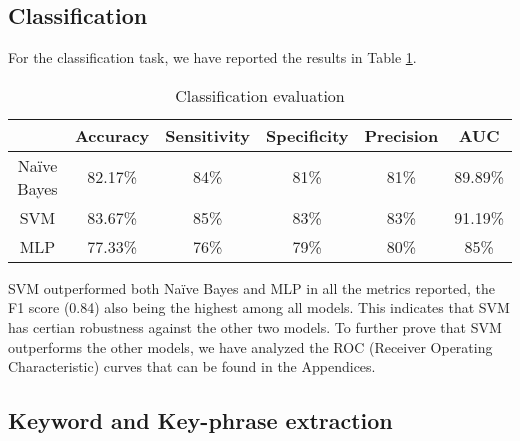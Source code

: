 \subsection{Classification}
For the classification task, we have reported the results in Table \ref{tab:evaluation}.
\begin{table}[!htb]
  \centering
    \begin{tabular}{|c|c|c|c|c|c|}
    \hline
    &Accuracy&Sensitivity&Specificity&Precision&AUC\\
    \hline
    Naïve Bayes&82.17\%&84\%&81\%&81\%&89.89\%\\
    \hline
    SVM&83.67\%&85\%&83\%&83\%&91.19\%\\
    \hline
    MLP&77.33\%&76\%&79\%&80\%&85\%\\
    \hline
    \end{tabular}
    \caption{Classification evaluation}
    \label{tab:evaluation}
\end{table}

SVM outperformed both Naïve Bayes and MLP in all the metrics reported, the F1 score (0.84) also being the highest among all models. This indicates that SVM has certian robustness against the other two models. To further prove that SVM outperforms the other models, we have analyzed the ROC (Receiver Operating Characteristic) curves that can be found in the Appendices.

\subsection{Keyword and Key-phrase extraction}